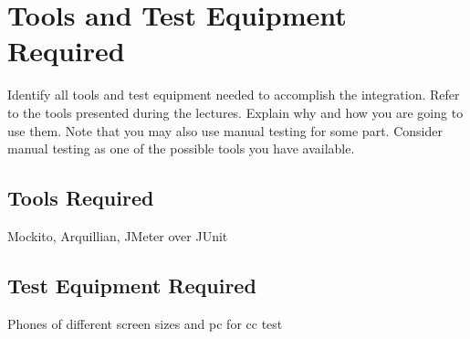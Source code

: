 \section{Tools and Test Equipment Required}

Identify all tools and test equipment needed to accomplish the integration. Refer to the tools presented during the lectures. Explain why and how you are going to use them.
Note that you may also use manual testing for some part. Consider manual testing as one of the possible tools you have available.

\subsection{Tools Required}
Mockito, Arquillian, JMeter over JUnit

\subsection{Test Equipment Required}
Phones of different screen sizes and pc for cc test
